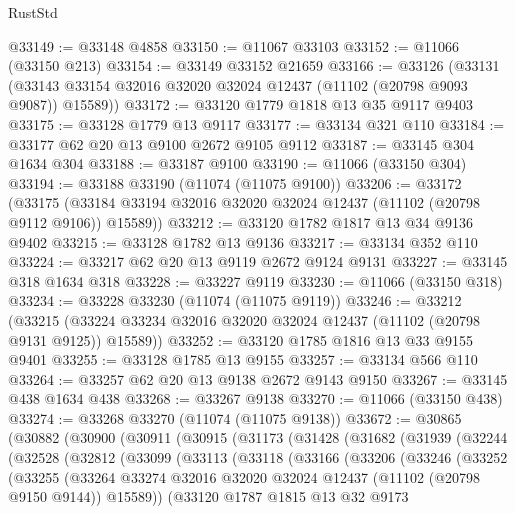 \begin{lexlean}{RustStd}
\begin{coremodule}
@33149 := @33148 @4858
@33150 := @11067 @33103
@33152 := @11066 (@33150 @213)
@33154 := @33149 @33152 @21659
@33166 := @33126
    (@33131 (@33143 @33154 @32016 @32020 @32024 @12437 (@11102 (@20798 @9093 @9087)) @15589))
@33172 := @33120 @1779 @1818 @13 @35 @9117 @9403
@33175 := @33128 @1779 @13 @9117
@33177 := @33134 @321 @110
@33184 := @33177 @62 @20 @13 @9100 @2672 @9105 @9112
@33187 := @33145 @304 @1634 @304
@33188 := @33187 @9100
@33190 := @11066 (@33150 @304)
@33194 := @33188 @33190 (@11074 (@11075 @9100))
@33206 := @33172
    (@33175 (@33184 @33194 @32016 @32020 @32024 @12437 (@11102 (@20798 @9112 @9106)) @15589))
@33212 := @33120 @1782 @1817 @13 @34 @9136 @9402
@33215 := @33128 @1782 @13 @9136
@33217 := @33134 @352 @110
@33224 := @33217 @62 @20 @13 @9119 @2672 @9124 @9131
@33227 := @33145 @318 @1634 @318
@33228 := @33227 @9119
@33230 := @11066 (@33150 @318)
@33234 := @33228 @33230 (@11074 (@11075 @9119))
@33246 := @33212
    (@33215 (@33224 @33234 @32016 @32020 @32024 @12437 (@11102 (@20798 @9131 @9125)) @15589))
@33252 := @33120 @1785 @1816 @13 @33 @9155 @9401
@33255 := @33128 @1785 @13 @9155
@33257 := @33134 @566 @110
@33264 := @33257 @62 @20 @13 @9138 @2672 @9143 @9150
@33267 := @33145 @438 @1634 @438
@33268 := @33267 @9138
@33270 := @11066 (@33150 @438)
@33274 := @33268 @33270 (@11074 (@11075 @9138))
@33672 := @30865
    (@30882
      (@30900
        (@30911
          (@30915
            (@31173
              (@31428
                (@31682
                  (@31939
                    (@32244
                      (@32528
                        (@32812
                          (@33099
                            (@33113
                              (@33118
                                (@33166
                                  (@33206
                                    (@33246
                                      (@33252
                                        (@33255
                                          (@33264
                                            @33274
                                            @32016
                                            @32020
                                            @32024
                                            @12437
                                            (@11102 (@20798 @9150 @9144))
                                            @15589))
                                        (@33120
                                          @1787
                                          @1815
                                          @13
                                          @32
                                          @9173

\end{coremodule}
\end{lexlean}
